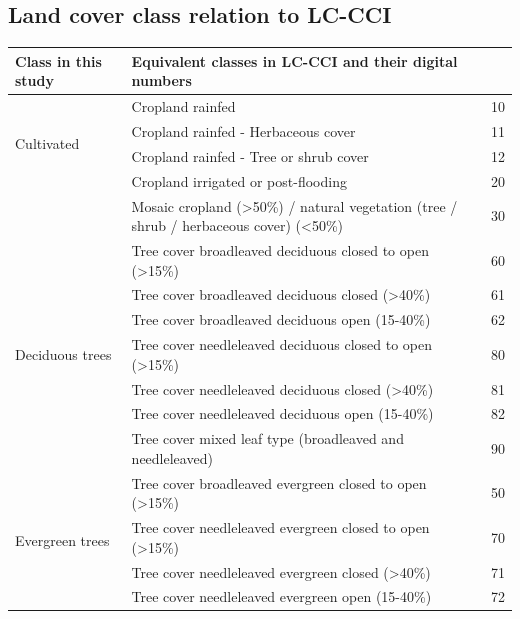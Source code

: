 \documentclass[a4paper,12pt]{scrbook}
\begin{document}
\begin{appendices}
 \chapter{Land cover class relation to LC-CCI}
 \label{appendix-classes}
 \begin{table}[!ht]
  \begin{center}
      \begin{tabular}{lp{10.5cm}l}
	\hline
	Class in this study & Equivalent classes in LC-CCI and their digital numbers & \\
	\hline
	\multirow{4}{*}{Cultivated} & Cropland rainfed & 10 \\
	  & Cropland rainfed - Herbaceous cover & 11 \\
	  & Cropland rainfed - Tree or shrub cover & 12 \\
	  & Cropland irrigated or post-flooding & 20 \\
	  & Mosaic cropland (>50\%) / natural vegetation (tree / shrub / herbaceous cover) (<50\%) & 30 \\
	\hline
	\multirow{7}{*}{Deciduous trees} & Tree cover  broadleaved  deciduous  closed to open (>15\%) & 60 \\
	  & Tree cover  broadleaved  deciduous  closed (>40\%) & 61 \\
	  & Tree cover  broadleaved  deciduous  open (15-40\%) & 62 \\
	  & Tree cover  needleleaved  deciduous  closed to open (>15\%) & 80 \\
	  & Tree cover  needleleaved  deciduous  closed (>40\%) & 81 \\
	  & Tree cover  needleleaved  deciduous  open (15-40\%) & 82 \\
	  & Tree cover  mixed leaf type (broadleaved and needleleaved) & 90 \\
	\hline
	\multirow{4}{*}{Evergreen trees} & Tree cover broadleaved evergreen closed to open (>15\%) & 50 \\
	  & Tree cover  needleleaved  evergreen  closed to open (>15\%) & 70 \\
	  & Tree cover  needleleaved  evergreen  closed (>40\%) & 71 \\
	  & Tree cover  needleleaved  evergreen  open (15-40\%) & 72 \\

\end{tabular}
\end{center}
\end{table}
\end{appendices}
\end{document}
